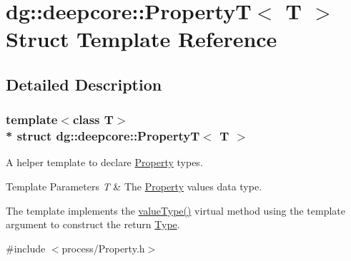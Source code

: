 \hypertarget{structdg_1_1deepcore_1_1_property_t}{}\section{dg\+:\+:deepcore\+:\+:PropertyT$<$ T $>$ Struct Template Reference}
\label{structdg_1_1deepcore_1_1_property_t}


\subsection{Detailed Description}
\subsubsection*{template$<$class T$>$\\*
struct dg\+::deepcore\+::\+Property\+T$<$ T $>$}

A helper template to declare \hyperlink{classdg_1_1deepcore_1_1_property}{Property} types. 


\begin{DoxyTemplParams}{Template Parameters}
{\em T} & The \hyperlink{classdg_1_1deepcore_1_1_property}{Property} value\textquotesingle{}s data type.\\
\hline
\end{DoxyTemplParams}
The template implements the \hyperlink{structdg_1_1deepcore_1_1_property_t_a58e459741375097dc9551206b8f7ca32}{value\+Type()} virtual method using the template argument to construct the return \hyperlink{classdg_1_1deepcore_1_1_type}{Type}. 

{\ttfamily \#include $<$process/\+Property.\+h$>$}



